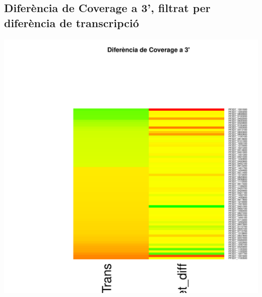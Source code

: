 \documentclass{article}\usepackage[]{graphicx}\usepackage[]{color}
\newenvironment{knitrout}{}{} %
\begin{document}
\subsection{Diferència de Coverage a 3', filtrat per diferència de transcripció}
\begin{knitrout}
\color{fgcolor}

{\centering \includegraphics[width=.9\linewidth]{figure/minimal-_heat_cov_diff_3-1} 

}



\end{knitrout}



\clearpage
\end{document}
